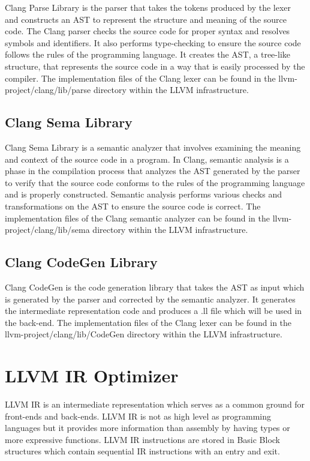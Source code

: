 Clang Parse Library is the parser that takes the tokens produced by the lexer and constructs an AST to represent the structure and meaning of the source code. The Clang parser checks the source code for proper syntax and resolves symbols and identifiers. It also performs type-checking to ensure the source code follows the rules of the programming language. It creates the AST, a tree-like structure, that represents the source code in a way that is easily processed by the compiler. The implementation files of the Clang lexer can be found in the llvm-project/clang/lib/parse directory within the LLVM infrastructure.

\subsection{Clang Sema Library}

Clang Sema Library is a semantic analyzer that involves examining the meaning and context of the source code in a program. In Clang, semantic analysis is a phase in the compilation process that analyzes the AST generated by the parser to verify that the source code conforms to the rules of the programming language and is properly constructed. Semantic analysis performs various checks and transformations on the AST to ensure the source code is correct. The implementation files of the Clang semantic analyzer can be found in the llvm-project/clang/lib/sema directory within the LLVM infrastructure.

\subsection{Clang CodeGen Library}

Clang CodeGen is the code generation library that takes the AST as input which is generated by the parser and corrected by the semantic analyzer. It generates the intermediate representation code and produces a .ll file which will be used in the back-end. The implementation files of the Clang lexer can be found in the llvm-project/clang/lib/CodeGen directory within the LLVM infrastructure. 

\section{LLVM IR Optimizer}\label{sec:opt}
LLVM IR is an intermediate representation which serves as a common ground for front-ends and back-ends. LLVM IR is not as high level as programming languages but it provides more information than assembly by having types or more expressive functions. LLVM IR instructions are stored in Basic Block structures which contain sequential IR instructions with an entry and exit. 

